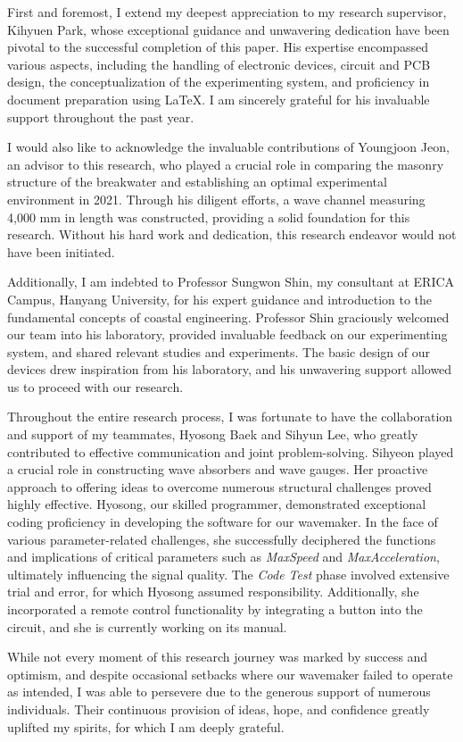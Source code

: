 \begin{acknowledgements}
    First and foremost, I extend my deepest appreciation to my research supervisor, Kihyuen Park, whose exceptional guidance and unwavering dedication have been pivotal to the successful completion of this paper. His expertise encompassed various aspects, including the handling of electronic devices, circuit and PCB design, the conceptualization of the experimenting system, and proficiency in document preparation using \LaTeX. I am sincerely grateful for his invaluable support throughout the past year.

    I would also like to acknowledge the invaluable contributions of Youngjoon Jeon, an advisor to this research, who played a crucial role in comparing the masonry structure of the breakwater and establishing an optimal experimental environment in 2021. Through his diligent efforts, a wave channel measuring 4,000 mm in length was constructed, providing a solid foundation for this research. Without his hard work and dedication, this research endeavor would not have been initiated.

    Additionally, I am indebted to Professor Sungwon Shin, my consultant at ERICA Campus, Hanyang University, for his expert guidance and introduction to the fundamental concepts of coastal engineering. Professor Shin graciously welcomed our team into his laboratory, provided invaluable feedback on our experimenting system, and shared relevant studies and experiments. The basic design of our devices drew inspiration from his laboratory, and his unwavering support allowed us to proceed with our research.

    Throughout the entire research process, I was fortunate to have the collaboration and support of my teammates, Hyosong Baek and Sihyun Lee, who greatly contributed to effective communication and joint problem-solving. Sihyeon played a crucial role in constructing wave absorbers and wave gauges. Her proactive approach to offering ideas to overcome numerous structural challenges proved highly effective. Hyosong, our skilled programmer, demonstrated exceptional coding proficiency in developing the software for our wavemaker. In the face of various parameter-related challenges, she successfully deciphered the functions and implications of critical parameters such as \textit{MaxSpeed} and \textit{MaxAcceleration}, ultimately influencing the signal quality. The \textit{Code Test} phase involved extensive trial and error, for which Hyosong assumed responsibility. Additionally, she incorporated a remote control functionality by integrating a button into the circuit, and she is currently working on its manual.

    While not every moment of this research journey was marked by success and optimism, and despite occasional setbacks where our wavemaker failed to operate as intended, I was able to persevere due to the generous support of numerous individuals. Their continuous provision of ideas, hope, and confidence greatly uplifted my spirits, for which I am deeply grateful.
    
\end{acknowledgements}

